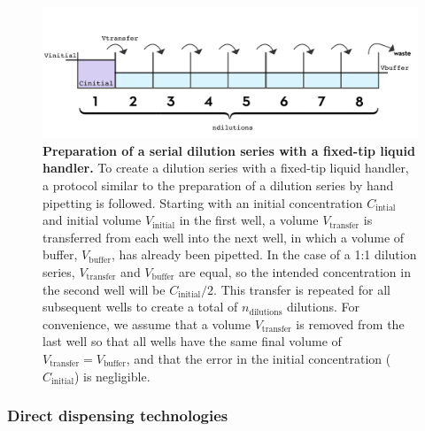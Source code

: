 \documentclass[aps,pre,twocolumn,nofootinbib,superscriptaddress,linenumbers]{revtex4-1}
\begin{document}
\begin{figure}[tb]
    \includegraphics[width=\columnwidth]{../figures/dilution.pdf}

  \caption{{\bf Preparation of a serial dilution series with a fixed-tip liquid handler.}
  To create a dilution series with a fixed-tip liquid handler, a protocol similar to the preparation of a dilution series by hand pipetting is followed.
  Starting with an initial concentration $C_\mathrm{intial}$ and initial volume $V_\mathrm{initial}$ in the first well, a volume $V_\mathrm{transfer}$ is transferred from each well into the next well, in which a volume of buffer, $V_\mathrm{buffer}$, has already been pipetted. 
  In the case of a 1:1 dilution series, $V_\mathrm{transfer}$ and $V_\mathrm{buffer}$ are equal, so the intended concentration in the second well will be $C_\mathrm{initial}/2$. 
  This transfer is repeated for all subsequent wells to create a total of $n_\mathrm{dilutions}$ dilutions. 
  For convenience, we assume that a volume $V_\mathrm{transfer}$ is removed from the last well so that all wells have the same final volume of $V_\mathrm{transfer} = V_\mathrm{buffer}$, and that the error in the initial concentration ($C_\mathrm{initial}$) is negligible.
  }
  \label{fig:dilution}
\end{figure}

\subsubsection*{Direct dispensing technologies}
\end{document}

